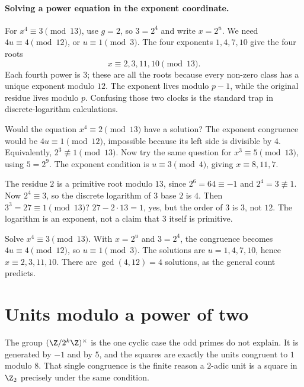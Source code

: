 \paragraph{Solving a power equation in the exponent coordinate.}
For $x^4\equiv3\pmod{13}$, use $g=2$, so $3=2^4$ and write $x=2^u$.
We need $4u\equiv4\pmod{12}$, or $u\equiv1\pmod3$. The four exponents
$1,4,7,10$ give the four roots
\[
 x\equiv2,3,11,10\pmod{13}.
\]
Each fourth power is $3$; these are all the roots because every non-zero
class has a unique exponent modulo $12$. The exponent lives modulo $p-1$,
while the original residue lives modulo $p$. Confusing those two clocks is
the standard trap in discrete-logarithm calculations.

\begin{think}
Would the equation $x^4\equiv2\pmod{13}$ have a solution? The exponent
congruence would be $4u\equiv1\pmod{12}$, impossible because its left side
is divisible by $4$. Equivalently, $2^3\not\equiv1\pmod{13}$.
Now try the same question for $x^3\equiv5\pmod{13}$, using $5=2^9$.
The exponent condition is $u\equiv3\pmod4$, giving $x\equiv8,11,7$.
\end{think}

\begin{examplex}
The residue $2$ is a primitive root modulo $13$, since $2^6=64\equiv -1$ and $2^4=3\not\equiv 1$. Now $2^4\equiv 3$, so the discrete logarithm of $3$ base $2$ is $4$. Then $3^3=27\equiv 1\pmod{13}$? $27-2\cdot 13=1$, yes, but the order of $3$ is $3$, not $12$. The logarithm is an exponent, not a claim that $3$ itself is primitive.
\end{examplex}

\begin{examplex}
Solve $x^4\equiv 3\pmod{13}$. With $x=2^u$ and $3=2^4$, the congruence becomes $4u\equiv 4\pmod{12}$, so $u\equiv 1\pmod 3$. The solutions are $u=1,4,7,10$, hence $x\equiv 2,3,11,10$. There are $\gcd(4,12)=4$ solutions, as the general count predicts.
\end{examplex}

\section{Units modulo a power of two}

The group $(\Z/2^k\Z)^\times$ is the one cyclic case the odd primes do not explain. It is generated by $-1$ and by $5$, and the squares are exactly the units congruent to $1$ modulo $8$. That single congruence is the finite reason a $2$-adic unit is a square in $\Z_2$ precisely under the same condition.

